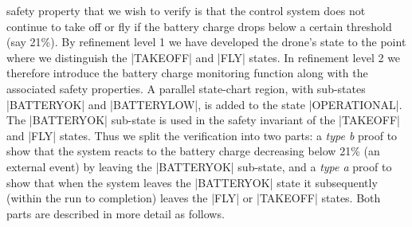  safety property that we wish to verify is that the control system does not continue to take off or fly if the battery charge drops below a certain threshold (say 21\%). 
By refinement level 1 we have developed the drone's state to the point where we distinguish the |TAKEOFF| and |FLY| states.
In refinement level 2 we therefore introduce the battery charge monitoring function along with the associated safety properties.
A parallel state-chart region, with sub-states |BATTERYOK| and |BATTERYLOW|, is added to the state |OPERATIONAL|.
The |BATTERYOK| sub-state is used in the safety invariant of the |TAKEOFF| and |FLY| states.
Thus we split the verification into two parts: a \emph{type b} proof to show that the system reacts to the battery charge decreasing below 21\% (an external event) by leaving the  |BATTERYOK| sub-state, and a \emph{type a} proof to show that when the system leaves the |BATTERYOK| state it subsequently (within the run to completion) leaves the |FLY| or |TAKEOFF| states. 
Both parts are described in more detail as follows.

